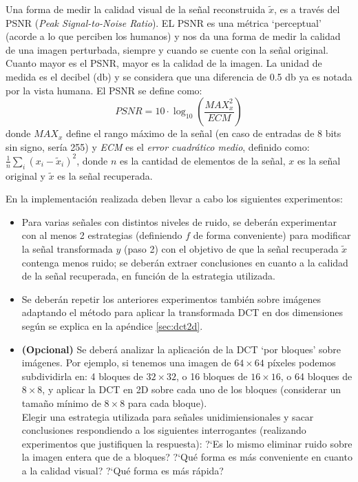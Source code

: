 \documentclass[10pt, a4paper]{article}
\begin{document}
\begin{itemize}
 
Una forma de medir la calidad visual de la se\~nal reconstruida $\tilde{x}$, es a trav\'es del PSNR ({\em Peak Signal-to-Noise Ratio}).
EL PSNR es una m\'etrica `perceptual' (acorde a lo que perciben los humanos) y nos da una forma de medir la calidad de una imagen perturbada, siempre y cuando se cuente con la se\~nal original. 
Cuanto mayor es el PSNR, mayor es la calidad de la imagen. La unidad de medida es el decibel (db) y se considera que una diferencia de 0.5 db ya es notada por la vista humana. El PSNR se define como:
$$
\mathit{PSNR} = 10 \cdot \log_{10} \left( \frac{\mathit{MAX}^2_x}{\mathit{ECM}} \right)
$$
donde $\mathit{MAX}_x$ define el rango m\'aximo de la se\~nal (en caso de entradas de 8 bits sin signo, ser\'ia 255) y \emph{ECM} es el {\em error cuadr\'atico medio}, definido como:
$ \frac{1}{n} \sum_{i}{(x_{i} - \tilde{x}_{i})^2} $,
donde $n$ es la cantidad de elementos de la se\~nal, $x$ es la se\~nal original y $\tilde{x}$ es la se\~nal recuperada.

En la implementaci\'on realizada deben llevar a cabo los siguientes experimentos:
\begin{itemize}
\item Para varias se\~nales con distintos niveles de ruido, se deber\'an experimentar con al menos 2 estrategias (definiendo $f$ de forma conveniente) para modificar la se\~nal transformada $y$ (paso 2) con el objetivo de que la se\~nal recuperada $\tilde{x}$ contenga menos ruido; se deber\'an extraer conclusiones en cuanto a la calidad de la se\~nal recuperada, en funci\'on de la estrategia utilizada.
\item Se deber\'an repetir los anteriores experimentos tambi\'en sobre im\'agenes adaptando el m\'etodo para aplicar la transformada DCT en dos dimensiones seg\'un se explica en la ap\'endice \ref{sec:dct2d}. 
\item {\bf (Opcional)} Se deber\'a analizar la aplicaci\'on de la DCT `por bloques' sobre im\'agenes. Por ejemplo, si tenemos una imagen de $64\times 64$ p\'ixeles podemos subdividirla en: 4 bloques de $32\times 32$, o 16 bloques de $16\times 16$, o 64 bloques de $8\times 8$, y aplicar la DCT en 2D sobre cada uno de los bloques (considerar un tama\~no m\'inimo de $8\times 8$ para cada bloque).\\ 
Elegir una estrategia utilizada para se\~nales unidimiensionales y sacar conclusiones respondiendo a los siguientes interrogantes (realizando experimentos que justifiquen la respuesta): ?`Es lo mismo eliminar ruido sobre la imagen entera que de a bloques? ?`Qu\'e forma es m\'as conveniente en cuanto a la calidad visual? ?`Qu\'e forma es m\'as r\'apida? 
\end{itemize}


\end{itemize}
\end{document}
